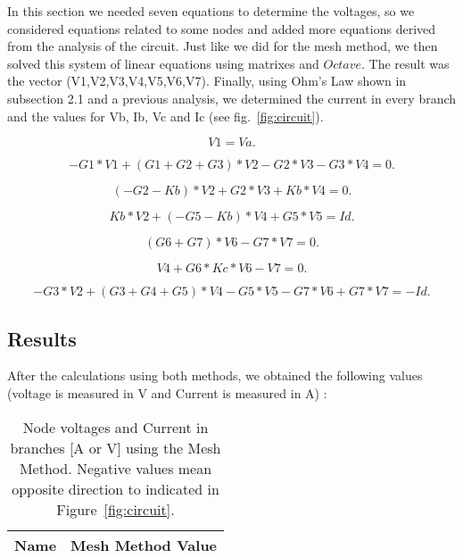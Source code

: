 In this section we needed seven equations to determine the voltages, so we considered equations related to some nodes and added more equations derived from the analysis of the circuit. Just like we did for the mesh method, we then solved this system of linear equations using matrixes and $Octave$. The result was the vector (V1,V2,V3,V4,V5,V6,V7). Finally, using Ohm’s Law shown in subsection 2.1 and a previous analysis, we determined the current in every branch and the values for Vb, Ib, Vc and Ic (see fig.~\ref{fig:circuit}).


\begin{equation}
  V1 = Va.
  \label{eq:vn1}
\end{equation}

\begin{equation}
  -G1*V1 + (G1+G2+G3)*V2 - G2*V3 - G3*V4 = 0.
  \label{eq:n2}
\end{equation}

\begin{equation}
  (-G2-Kb)*V2 + G2*V3 + Kb*V4 = 0.
  \label{eq:n3}
\end{equation}

\begin{equation}
  Kb*V2 + (-G5-Kb)*V4 + G5*V5 = Id.
  \label{eq:n4}
\end{equation}

\begin{equation}
  (G6 + G7)*V6 - G7*V7 = 0.
  \label{eq:n5}
\end{equation}

\begin{equation}
  V4 + G6*Kc*V6 - V7 = 0.
  \label{eq:n6}
\end{equation}

\begin{equation}
  -G3*V2 + (G3+G4+G5)*V4 - G5*V5 - G7*V6 + G7*V7 = -Id.
  \label{eq:n7}
\end{equation}



\subsection{Results}

After the calculations using both methods, we obtained the following values (voltage is measured in V and Current is measured in A) :


\begin{table}[h]
  \centering
  \begin{tabular}{|l|r|}
    \hline    
    {\bf Name} & {\bf Mesh Method Value}\\ \hline
    
  \end{tabular}
  \caption{Node voltages and Current in branches [A or V] using the Mesh Method. Negative values mean opposite direction to indicated in Figure~\ref{fig:circuit}.}
  \label{tab:rm}
\end{table}



